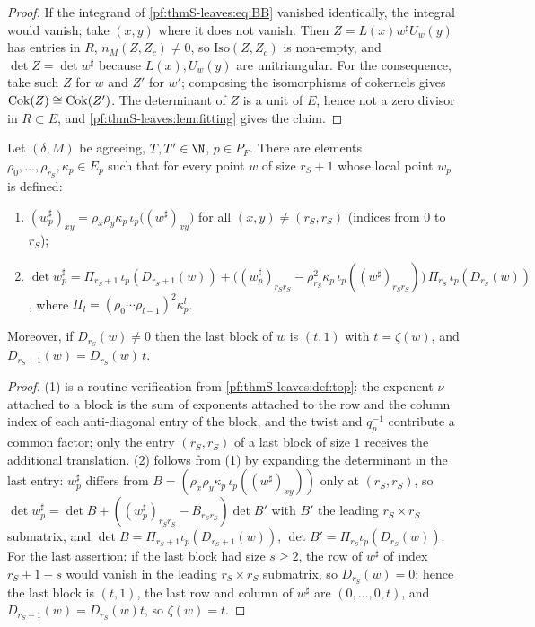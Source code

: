 \begin{proof}
If the integrand of \eqref{pf:thmS-leaves:eq:BB} vanished identically, the integral would vanish; take $(x,y)$ where it
does not vanish. Then $Z=L(x)w^\sharp U_w(y)$ has entries in $R$, $n_M(Z,Z_c)\ne0$, so $\mathrm{Iso}(Z,Z_c)$ is
non-empty, and $\det Z=\det w^\sharp$ because $L(x),U_w(y)$ are unitriangular. For the consequence, take such $Z$ for
$w$ and $Z'$ for $w'$; composing the isomorphisms of cokernels gives $\mathrm{Cok}(Z)\cong\mathrm{Cok}(Z')$. The
determinant of $Z$ is a unit of $E$, hence not a zero divisor in $R\subset E$, and \cref{pf:thmS-leaves:lem:fitting}
gives the claim.
\end{proof}

\begin{lemma}\label{pf:thmS-leaves:lem:shape}
Let $(\delta,M)$ be agreeing, $T,T'\in\N$, $p\in P_F$. There are elements $\rho_0,\dots,\rho_{r_S},\kappa_p\in E_p$ such
that for every point $w$ of size $r_S+1$ whose local point $w_p$ is defined:
\begin{enumerate}
\item $(w_p^\sharp)_{xy}=\rho_x\rho_y\kappa_p\,\iota_p\bigl((w^\sharp)_{xy}\bigr)$ for all $(x,y)\ne(r_S,r_S)$ (indices from
$0$ to $r_S$);
\item $\det w_p^\sharp=\Pi_{r_S+1}\,\iota_p(D_{r_S+1}(w))+\bigl((w_p^\sharp)_{r_Sr_S}-\rho_{r_S}^2\kappa_p\,
\iota_p((w^\sharp)_{r_Sr_S})\bigr)\,\Pi_{r_S}\,\iota_p(D_{r_S}(w))$, where $\Pi_l=(\rho_0\cdots\rho_{l-1})^2\kappa_p^l$.
\end{enumerate}
Moreover, if $D_{r_S}(w)\ne0$ then the last block of $w$ is $(t,1)$ with $t=\zeta(w)$, and $D_{r_S+1}(w)=D_{r_S}(w)\,t$.
\end{lemma}

\begin{proof}
(1) is a routine verification from \cref{pf:thmS-leaves:def:top}: the exponent $\nu$ attached to a block is the sum of
exponents attached to the row and the column index of each anti-diagonal entry of the block, and the twist and $q_p^{-1}$
contribute a common factor; only the entry $(r_S,r_S)$ of a last block of size $1$ receives the additional translation.
(2) follows from (1) by expanding the determinant in the last entry: $w_p^\sharp$ differs from
$B=(\rho_x\rho_y\kappa_p\,\iota_p((w^\sharp)_{xy}))$ only at $(r_S,r_S)$, so
$\det w_p^\sharp=\det B+((w_p^\sharp)_{r_Sr_S}-B_{r_Sr_S})\det B'$ with $B'$ the leading $r_S\times r_S$ submatrix, and
$\det B=\Pi_{r_S+1}\iota_p(D_{r_S+1}(w))$, $\det B'=\Pi_{r_S}\iota_p(D_{r_S}(w))$. For the last assertion: if the last block
had size $s\ge2$, the row of $w^\sharp$ of index $r_S+1-s$ would vanish in the leading $r_S\times r_S$ submatrix, so
$D_{r_S}(w)=0$; hence the last block is $(t,1)$, the last row and column of $w^\sharp$ are $(0,\dots,0,t)$, and
$D_{r_S+1}(w)=D_{r_S}(w)t$, so $\zeta(w)=t$.
\end{proof}

